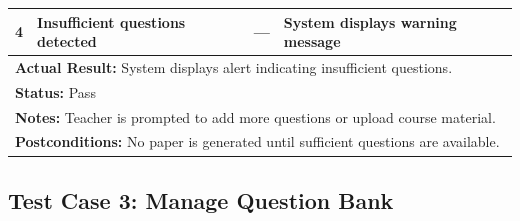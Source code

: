 \documentclass[12pt]{article}
\begin{document}
\begin{table}[H]
{\begin{tabular}{|p{3.3cm}|p{5.1cm}|p{3.3cm}|p{5.1cm}|}
4 & Insufficient questions detected & --- &
System displays warning message \\ \hline

\multicolumn{4}{|l|}{\textbf{Actual Result:}
System displays alert indicating insufficient questions.} \\ \hline

\multicolumn{4}{|l|}{\textbf{Status:} Pass} \\ \hline
\multicolumn{4}{|l|}{\textbf{Notes:}
Teacher is prompted to add more questions or upload course material.} \\ \hline

\multicolumn{4}{|l|}{\textbf{Postconditions:}
No paper is generated until sufficient questions are available.} \\ \hline

\end{tabular}
}
\end{table}

\subsection{Test Case 3: Manage Question Bank}
\end{document}
